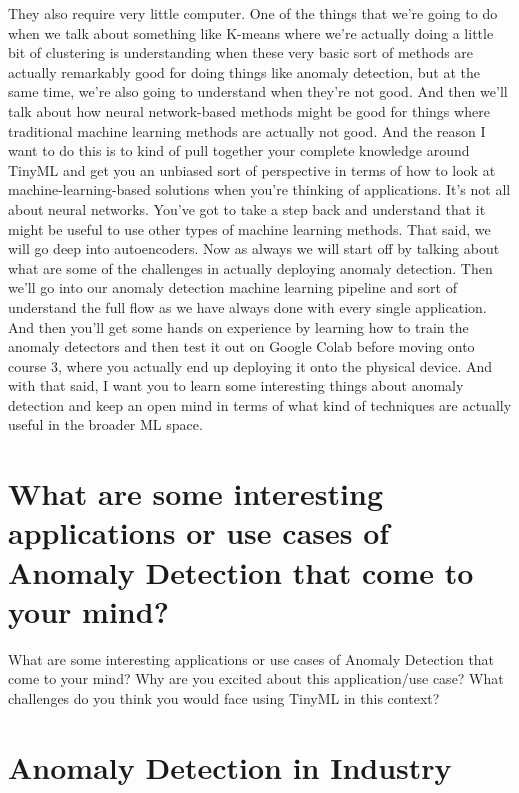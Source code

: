   They also require very little computer.
  One of the things that we're going to do when we talk about something
  like K-means where we're actually doing a little bit of clustering
  is understanding when these very basic sort of methods
  are actually remarkably good for doing things like anomaly detection,
  but at the same time, we're also going to understand when they're not good.
  And then we'll talk about how neural network-based methods might
  be good for things where traditional machine learning methods are actually
  not good.
  And the reason I want to do this is to kind of pull together
  your complete knowledge around TinyML and get
  you an unbiased sort of perspective in terms
  of how to look at machine-learning-based solutions
  when you're thinking of applications.
  It's not all about neural networks.
  You've got to take a step back and understand
  that it might be useful to use other types of machine learning methods.
  That said, we will go deep into autoencoders.
  Now as always we will start off by talking
  about what are some of the challenges in actually deploying anomaly detection.
  Then we'll go into our anomaly detection machine learning pipeline
  and sort of understand the full flow as we have always
  done with every single application.
  And then you'll get some hands on experience
  by learning how to train the anomaly detectors
  and then test it out on Google Colab before moving onto course 3,
  where you actually end up deploying it onto the physical device.
  And with that said, I want you to learn some interesting things
  about anomaly detection and keep an open mind
  in terms of what kind of techniques are actually
  useful in the broader ML space.
  
  \section{What are some interesting applications or use cases of Anomaly Detection that come to your mind?}
  
  What are some interesting applications or use cases of Anomaly Detection that come to your mind? Why are you excited about this application/use case? What challenges do you think you would face using TinyML in this context?
  
  \section{Anomaly Detection in Industry}
  
